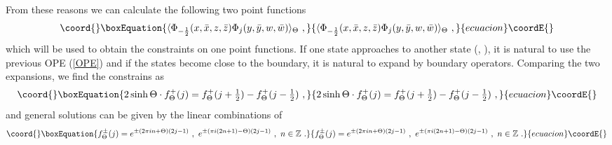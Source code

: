\documentclass[a4paper,12pt]{article}
\providecommand{\bz}{\mathbb Z}
\begin{document}
From these reasons we can calculate the following two point functions
\begin{equation}\coord{}\boxEquation{
 \langle \Phi_{-\frac{1}{2}} (x,\bar{x},z,\bar{z}) 
  \Phi_{j} (y,\bar{y},w,\bar{w}) 
 \rangle_{\Theta} ~,
}{
 \langle \Phi_{-\frac{1}{2}} (x,\bar{x},z,\bar{z}) 
  \Phi_{j} (y,\bar{y},w,\bar{w}) 
 \rangle_{\Theta} ~,
}{ecuacion}\coordE{}\end{equation}
which will be used to obtain the constraints on one point functions.
If one state approaches to another state (\coordHE{}, \coordHE{}), 
it is natural to use the previous 
OPE (\ref{OPE}) and if the states become close to the boundary, it is
natural to expand by boundary operators.
Comparing the two expansions, we find the constrains as
\begin{equation}\coord{}\boxEquation{
 2 \sinh \Theta \cdot f^+_{\Theta} (j) =
  f^+ _{\Theta}(j + \textstyle \frac{1}{2}) 
 - f^+ _{\Theta}(j - \textstyle \frac{1}{2}) ~,
}{
 2 \sinh \Theta \cdot f^+_{\Theta} (j) =
  f^+ _{\Theta}(j + \textstyle \frac{1}{2}) 
 - f^+ _{\Theta}(j - \textstyle \frac{1}{2}) ~,
}{ecuacion}\coordE{}\end{equation}  
and general solutions can be given by the linear combinations of
\begin{equation}\coord{}\boxEquation{
 f^{\pm}_{\Theta} (j) = e^{\pm (2 \pi i n + \Theta) (2j -1)} ~,~
  e^{\pm (\pi i (2n+1) - \Theta) (2j -1)} ~,~ n \in \bz ~.
}{
 f^{\pm}_{\Theta} (j) = e^{\pm (2 \pi i n + \Theta) (2j -1)} ~,~
  e^{\pm (\pi i (2n+1) - \Theta) (2j -1)} ~,~ n \in \bz ~.
}{ecuacion}\coordE{}\end{equation} 
\end{document}
